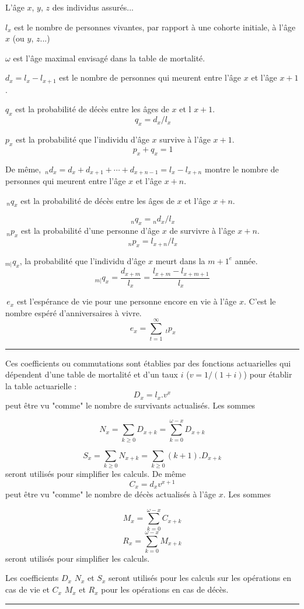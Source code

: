 
\begin{f}

L'âge \(x\), \(y\), \(z\) des individus assurés...    

\(l_x\) est le nombre de personnes vivantes, par rapport à une cohorte initiale, à l'âge \(x\) (ou \(y\), \(z\)...)

\(\omega\) est l'âge maximal envisagé dans la table de mortalité.

\(d_x=l_x-l_{x+1}\) est le nombre de personnes qui meurent entre l'âge \(x\) et l'âge \(x+1\).

\(q_x\) est la probabilité de décès entre les âges de \(x\) et l \(x+1\).
\[
\,q_x = d_x / l_x 
\]

\(p_x\) est la probabilité que l'individu  d'âge \(x\) survive à l'âge \(x+1\).
\[
\,p_x+q_x=1 
\]

De même, 
\(\,_nd_x = d_x + d_{x+1} + \cdots + d_{x+n-1} = l_x - l_{x+n}\) montre le nombre de personnes qui meurent entre l'âge \(x\) et l'âge \(x+n\).

\(\,_nq_x\) est la probabilité de décès entre les âges de \(x\) et l'âge \(x+n\).

\[
\,_nq_x = {}_nd_x / l_x
\]
\(\,_np_x\) est la probabilité d'une personne d'âge \(x\) de survivre à l'âge \(x+n\).
\[
\,_np_x = l_{x+n} / l_x 
\]


\({}_{m|}q_{x}\), la probabilité que l'individu d'âge \(x\) meurt dans la \({m+1}^e\) année.
\[{}_{m|}q_{x}=\frac{d_{x+m}}{l_x}=\frac{l_{x+m}-l_{x+m+1}}{l_x}\]

\(\,e_x\)  est l'espérance de vie pour une personne encore en vie à l'âge \(x\). 
C'est le nombre espéré d'anniversaires à vivre.
\[
\,e_x = \sum_{t=1}^{\infty} \ _tp_x 
\]
\end{f}
\hrule

\begin{f}


Ces coefficients ou commutations sont établies par des fonctions actuarielles qui dépendent d'une table de mortalité et d'un taux \(i\) (\(v=1/(1+i)\)) pour établir la table actuarielle :
\[
D_x=l_x .v^x
\]
peut être vu "comme" le nombre de survivants actualisés. Les sommes 

\[
N_x=\sum_{k\geq 0} D_{x+k}=\sum_{k= 0}^{\omega-x} D_{x+k}
\]

\[
S_x=\sum_{k\geq 0} N_{x+k}=\sum_{k\geq 0}(k+1). D_{x+k}
\]
seront utilisés pour simplifier les calculs.
De même
\[
C_x = d_x v^{ x+1} 
\]
peut être vu "comme" le nombre de décès  actualisés à l'âge \(x\). Les sommes

\[
M_x=\sum_{k= 0}^{\omega-x} C_{x+k}
\]
\[
R_x=\sum_{k= 0}^{\omega-x} M_{x+k}
\]
seront utilisés pour simplifier les calculs.

Les  coefficients \(D_x\) \(N_x\) et \(S_x\) seront utilisés pour les calculs sur les opérations en cas de vie et \(C_x\) \(M_x\) et \(R_x\)  pour les opérations en cas de décès.

\end{f} 
\hrule

